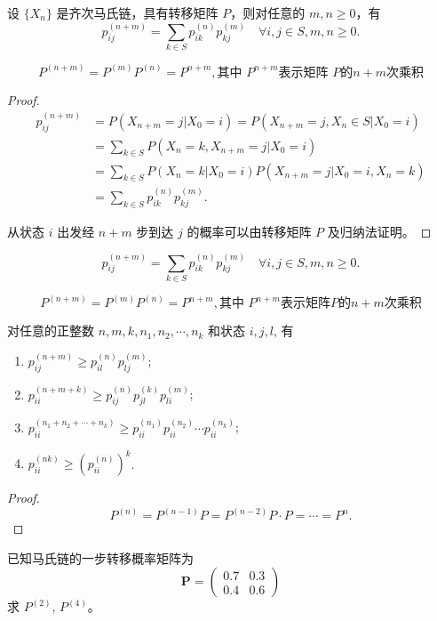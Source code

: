 \documentclass[lang=cn,10pt,thmcnt=section]{elegantbook}
\begin{document}
\begin{theorem}
	设 $\{X_n\}$ 是齐次马氏链，具有转移矩阵 $P$，则对任意的 $m, n \geq 0$，有
\[
p_{ij}^{(n+m)} = \sum_{k \in S} p_{ik}^{(n)} p_{kj}^{(m)} \quad \forall i, j \in S, m, n \geq 0.
\]

\[
P^{(n+m)} = P^{(m)} P^{(n)} = P^{n+m}, \text{其中 } P^{n+m} \text{表示矩阵 } P \text{的} n+m \text{次乘积}
\]
\end{theorem}
\begin{proof}
	\[
\begin{aligned}
p_{ij}^{(n+m)} &= P(X_{n+m} = j | X_0 = i) = P(X_{n+m} = j, X_n \in S | X_0 = i) \\
&= \sum_{k \in S} P(X_n = k, X_{n+m} = j | X_0 = i) \\
&= \sum_{k \in S} P(X_n = k | X_0 = i) P(X_{n+m} = j | X_0 = i, X_n = k) \\
&= \sum_{k \in S} p_{ik}^{(n)} p_{kj}^{(m)}.
\end{aligned}
\]

从状态 $i$ 出发经 $n+m$ 步到达 $j$ 的概率可以由转移矩阵 $P$ 及归纳法证明。
\end{proof}
\begin{theorem}
	\[
p_{ij}^{(n+m)} = \sum_{k \in S} p_{ik}^{(n)} p_{kj}^{(m)} \quad \forall i, j \in S, m, n \geq 0.
\]

\[
P^{(n+m)} = P^{(m)} P^{(n)} = P^{n+m}, \text{其中 } P^{n+m} \text{表示矩阵} P \text{的} n+m \text{次乘积}
\]
\end{theorem}
\begin{corollary}
	对任意的正整数 $n, m, k, n_1, n_2, \cdots, n_k$ 和状态 $i, j, l$, 有
\begin{enumerate}
    \item $p_{ij}^{(n+m)} \geq p_{il}^{(n)} p_{lj}^{(m)}$;
    \item $p_{ii}^{(n+m+k)} \geq p_{ij}^{(n)} p_{jl}^{(k)} p_{li}^{(m)}$;
    \item $p_{ii}^{(n_1+n_2+\cdots+n_k)} \geq p_{ii}^{(n_1)} p_{ii}^{(n_2)} \cdots p_{ii}^{(n_k)}$;
    \item $p_{ii}^{(nk)} \geq (p_{ii}^{(n)})^k$.
\end{enumerate}

\end{corollary}
\begin{proof}
	\[
P^{(n)} = P^{(n-1)}P = P^{(n-2)}P \cdot P = \cdots = P^n.
\]
\end{proof}
\begin{example}
	已知马氏链的一步转移概率矩阵为
\[
\mathbf{P} = \begin{pmatrix}
0.7 & 0.3 \\
0.4 & 0.6
\end{pmatrix}
\]
求 $P^{(2)}$, $P^{(4)}$。
\end{example}
\end{document}
